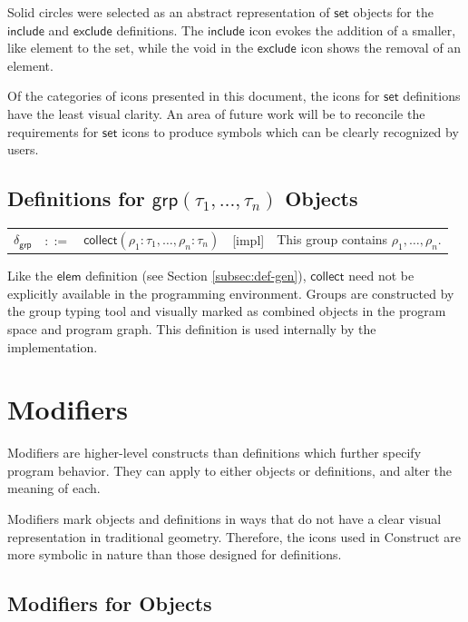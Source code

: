 \documentclass[twoside,openright,11pt]{report}
\begin{document}
Solid circles were selected as an abstract representation of $\mathsf{set}$ objects for the $\mathsf{include}$ and $\mathsf{exclude}$ definitions.
The $\mathsf{include}$ icon evokes the addition of a smaller, like element to the set, while the void in the $\mathsf{exclude}$ icon shows the removal of an element.

Of the categories of icons presented in this document, the icons for $\mathsf{set}$ definitions have the least visual clarity.
An area of future work will be to reconcile the requirements for $\mathsf{set}$ icons to produce symbols which can be clearly recognized by users.

\subsection{Definitions for $\mathsf{grp}(\tau_1, \dots , \tau_n)$ Objects}
\label{subsec:def-grp}

\noindent\begin{tabularx}{\textwidth}{p{0.5cm} p{0.5cm} p{5cm} c X}
$\delta_{\mathsf{grp}}$ & $::=$ & $\mathsf{collect}(\rho_1 : \tau_1, \dots, \rho_n : \tau_n)$ & [impl] & This group contains $\rho_1, \dots, \rho_n$.
\end{tabularx}

Like the $\mathsf{elem}$ definition (see Section \ref{subsec:def-gen}), $\mathsf{collect}$ need not be explicitly available in the programming environment. 
Groups are constructed by the group typing tool and visually marked as combined objects in the program space and program graph. 
This definition is used internally by the implementation.

\section{Modifiers}
\label{sec:mods}

Modifiers are higher-level constructs than definitions which further specify program behavior.
They can apply to either objects or definitions, and alter the meaning of each.

Modifiers mark objects and definitions in ways that do not have a clear visual representation in traditional geometry.
Therefore, the icons used in Construct are more symbolic in nature than those designed for definitions.

\subsection{Modifiers for Objects}
\label{subsec:mods-obj}
\end{document}
